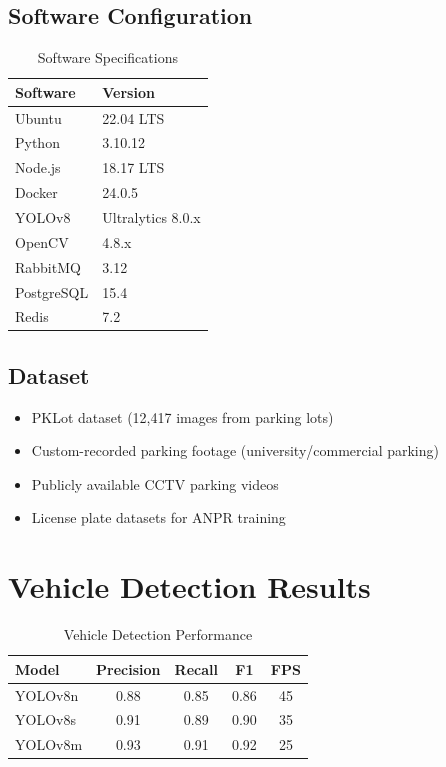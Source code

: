 \documentclass[12pt,a4paper]{report}
\begin{document}
\subsection{Software Configuration}
\begin{table}[H]
\centering
\caption{Software Specifications}
\begin{tabular}{|l|l|}
\hline
\textbf{Software} & \textbf{Version} \\
\hline
Ubuntu & 22.04 LTS \\
\hline
Python & 3.10.12 \\
\hline
Node.js & 18.17 LTS \\
\hline
Docker & 24.0.5 \\
\hline
YOLOv8 & Ultralytics 8.0.x \\
\hline
OpenCV & 4.8.x \\
\hline
RabbitMQ & 3.12 \\
\hline
PostgreSQL & 15.4 \\
\hline
Redis & 7.2 \\
\hline
\end{tabular}
\end{table}

\subsection{Dataset}
\begin{itemize}
    \item PKLot dataset (12,417 images from parking lots)
    \item Custom-recorded parking footage (university/commercial parking)
    \item Publicly available CCTV parking videos
    \item License plate datasets for ANPR training
\end{itemize}

\section{Vehicle Detection Results}

\begin{table}[H]
\centering
\caption{Vehicle Detection Performance}
\begin{tabular}{|l|c|c|c|c|}
\hline
\textbf{Model} & \textbf{Precision} & \textbf{Recall} & \textbf{F1} & \textbf{FPS} \\
\hline
YOLOv8n & 0.88 & 0.85 & 0.86 & 45 \\
\hline
YOLOv8s & 0.91 & 0.89 & 0.90 & 35 \\
\hline
YOLOv8m & 0.93 & 0.91 & 0.92 & 25 \\
\hline
\end{tabular}
\end{table}
\end{document}
